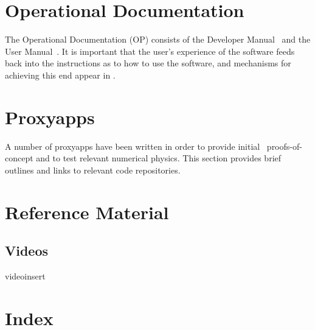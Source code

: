 \chapter{Operational Documentation}\label{sec:OP}
The Operational Documentation (OP) consists of the Developer Manual~ and
the User Manual~. It is important that
the user's experience of the software feeds back into the instructions
as to how to use the software, and mechanisms for achieving this end appear
in .

% 
% 
% 
% 

\chapter{Proxyapps}\label{sec:proxyapps}
A number of proxyapps have been written in order to provide initial \nep \ proofs-of-concept and to test relevant 
numerical physics.  This section provides brief outlines and links to relevant code repositories.


\chapter{Reference Material}\label{sec:REF}


\begin{warpHTML}
\chapter{Videos}\label{sec:videos}
videoinsert
\end{warpHTML}

\chapter{Index}\label{sec:IND}

